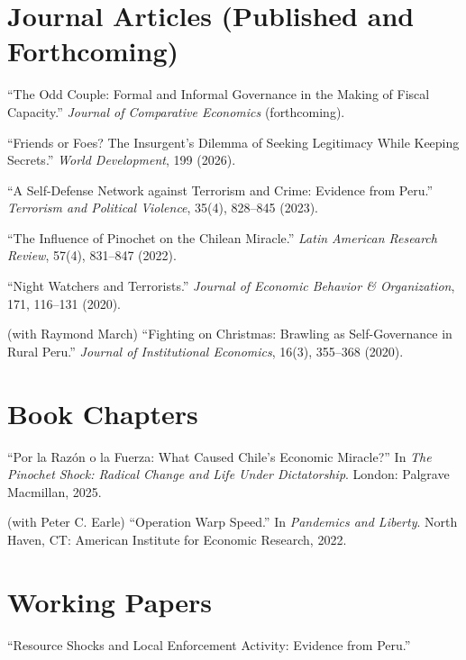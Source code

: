 \documentclass[11pt,letterpaper]{article}
\newenvironment{entries}
  {\begin{list}{}{\setlength{\leftmargin}{1.2em}\setlength{\itemindent}{-1.2em}\setlength{\itemsep}{5pt}\setlength{\topsep}{2pt}}}
  {\end{list}}
\begin{document}
\section{Journal Articles (Published and Forthcoming)}
\begin{entries}
\item[] ``The Odd Couple: Formal and Informal Governance in the Making of Fiscal Capacity.'' \textit{Journal of Comparative Economics} (forthcoming).
\item[] ``Friends or Foes? The Insurgent's Dilemma of Seeking Legitimacy While Keeping Secrets.'' \textit{World Development}, 199 (2026).
\item[] ``A Self-Defense Network against Terrorism and Crime: Evidence from Peru.'' \textit{Terrorism and Political Violence}, 35(4), 828--845 (2023).
\item[] ``The Influence of Pinochet on the Chilean Miracle.'' \textit{Latin American Research Review}, 57(4), 831--847 (2022).
\item[] ``Night Watchers and Terrorists.'' \textit{Journal of Economic Behavior \& Organization}, 171, 116--131 (2020).
\item[] (with Raymond March) ``Fighting on Christmas: Brawling as Self-Governance in Rural Peru.'' \textit{Journal of Institutional Economics}, 16(3), 355--368 (2020).
\end{entries}

\section{Book Chapters}
\begin{entries}
\item[] ``Por la Razón o la Fuerza: What Caused Chile's Economic Miracle?'' In \textit{The Pinochet Shock: Radical Change and Life Under Dictatorship}. London: Palgrave Macmillan, 2025.
\item[] (with Peter C. Earle) ``Operation Warp Speed.'' In \textit{Pandemics and Liberty}. North Haven, CT: American Institute for Economic Research, 2022.
\end{entries}

\section{Working Papers}
\begin{entries}
\item[] ``Resource Shocks and Local Enforcement Activity: Evidence from Peru.''
\end{entries}
\end{document}
